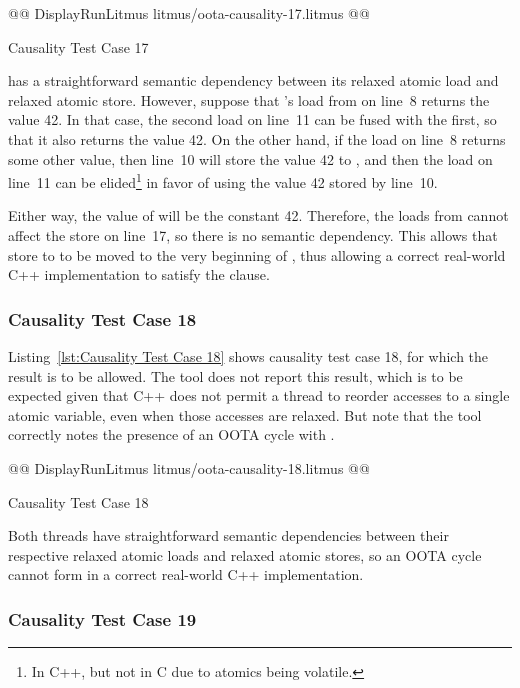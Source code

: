 \documentclass[10]{article}
\begin{document}
\begin{listing}[tbp]
@@ DisplayRunLitmus litmus/oota-causality-17.litmus @@
\caption{Causality Test Case 17}
\label{lst:Causality Test Case 17}
\end{listing}

 has a straightforward semantic dependency between its
relaxed atomic load and relaxed atomic store.
However, suppose that 's load from  on line~8 returns
the value 42.
In that case, the second load on line~11 can be fused with the first,
so that it also returns the value 42.
On the other hand, if the load on line~8 returns some other value, then
line~10 will store the value 42 to , and then the load on line~11
can be elided\footnote{
	In C++, but not in C due to atomics being volatile.}
in favor of using the value 42 stored by line~10.

Either way, the value of  will be the constant 42.
Therefore, the loads from  cannot affect the store on line~17,
so there is no semantic dependency.
This allows that store to  to be moved to the very beginning of
, thus allowing a correct real-world C++ implementation to
satisfy the  clause.

\subsubsection{Causality Test Case 18}
\label{app:Causality Test Case 18}

Listing~\ref{lst:Causality Test Case 18}
shows causality test case 18, for which the 
result is to be allowed.
The  tool does not report this result, which is to be expected
given that C++ does not permit a thread to reorder accesses to a single
atomic variable, even when those accesses are relaxed.
But note that the  tool correctly notes the presence of an
OOTA cycle with .

\begin{listing}[tbp]
@@ DisplayRunLitmus litmus/oota-causality-18.litmus @@
\caption{Causality Test Case 18}
\label{lst:Causality Test Case 18}
\end{listing}

Both threads have straightforward semantic dependencies between their
respective relaxed atomic loads and relaxed atomic stores, so an OOTA
cycle cannot form in a correct real-world C++ implementation.

\subsubsection{Causality Test Case 19}
\label{app:Causality Test Case 19}
\end{document}
